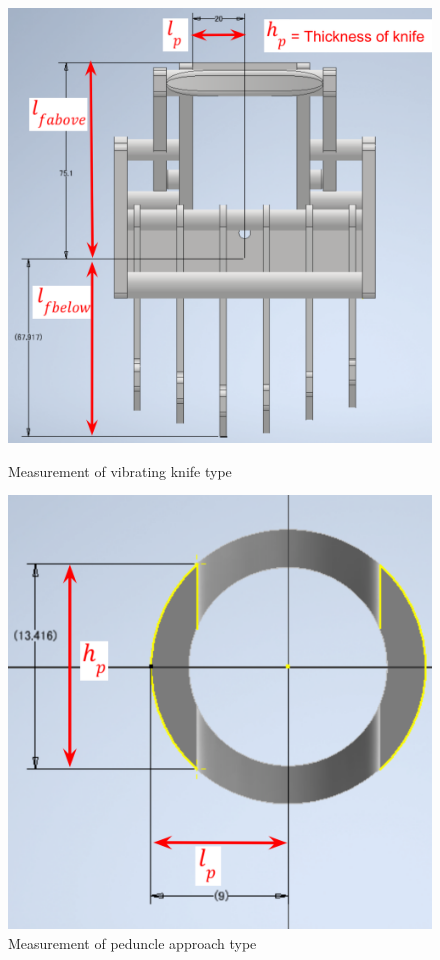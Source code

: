 \begin{figure}[H]
  \begin{minipage}[b]{0.48\columnwidth}
    \centering
    \includegraphics[width=\columnwidth]{images/png/sweepercad.png}
    \caption{Measurement of vibrating knife type}
    \label{Fig:sweepercad}
  \end{minipage}
  \hspace{0.04\columnwidth}
  \begin{minipage}[b]{0.48\columnwidth}
    \centering
    \includegraphics[width=\columnwidth]{images/png/agristcad.png}
    \caption{Measurement of peduncle approach type}
    \label{Fig:agristcad}
  \end{minipage}
\end{figure}